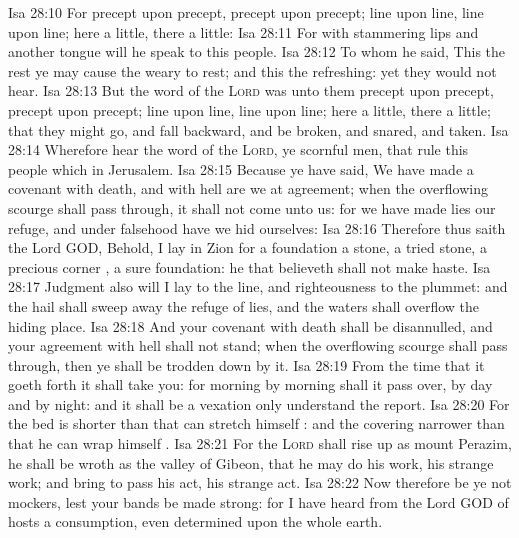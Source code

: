 \vs Isa 28:10 For precept  upon precept, precept upon precept; line upon line, line upon line; here a little,  there a little:
\vs Isa 28:11 For with stammering lips and another tongue will he speak to this people.
\vs Isa 28:12 To whom he said, This  the rest  ye may cause the weary to rest; and this  the refreshing: yet they would not hear.
\vs Isa 28:13 But the word of the \textsc{Lord} was unto them precept upon precept, precept upon precept; line upon line, line upon line; here a little,  there a little; that they might go, and fall backward, and be broken, and snared, and taken.
\vs Isa 28:14 Wherefore hear the word of the \textsc{Lord}, ye scornful men, that rule this people which  in Jerusalem.
\vs Isa 28:15 Because ye have said, We have made a covenant with death, and with hell are we at agreement; when the overflowing scourge shall pass through, it shall not come unto us: for we have made lies our refuge, and under falsehood have we hid ourselves:
\vs Isa 28:16 Therefore thus saith the Lord GOD, Behold, I lay in Zion for a foundation a stone, a tried stone, a precious corner , a sure foundation: he that believeth shall not make haste.
\vs Isa 28:17 Judgment also will I lay to the line, and righteousness to the plummet: and the hail shall sweep away the refuge of lies, and the waters shall overflow the hiding place.
\vs Isa 28:18 And your covenant with death shall be disannulled, and your agreement with hell shall not stand; when the overflowing scourge shall pass through, then ye shall be trodden down by it.
\vs Isa 28:19 From the time that it goeth forth it shall take you: for morning by morning shall it pass over, by day and by night: and it shall be a vexation only  understand the report.
\vs Isa 28:20 For the bed is shorter than that  can stretch himself : and the covering narrower than that he can wrap himself .
\vs Isa 28:21 For the \textsc{Lord} shall rise up as  mount Perazim, he shall be wroth as  the valley of Gibeon, that he may do his work, his strange work; and bring to pass his act, his strange act.
\vs Isa 28:22 Now therefore be ye not mockers, lest your bands be made strong: for I have heard from the Lord GOD of hosts a consumption, even determined upon the whole earth.
